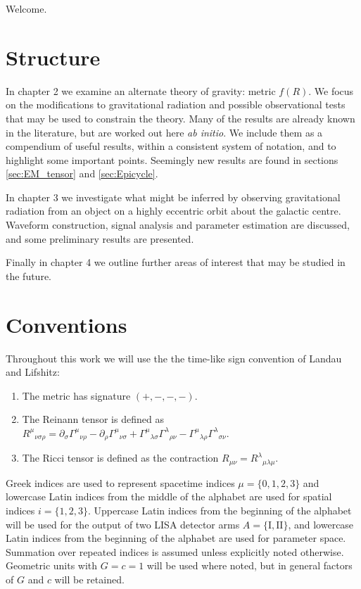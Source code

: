 \documentclass[a4paper, 11pt, titlepage, twoside]{report}
\begin{document}
Welcome.
\newpage

\section{Structure}

In chapter 2 we examine an alternate theory of gravity: metric $f(R)$. We focus on the modifications to gravitational radiation and possible observational tests that may be used to constrain the theory. Many of the results are already known in the literature, but are worked out here {\it ab initio}. We include them as a compendium of useful results, within a consistent system of notation, and to highlight some important points. Seemingly new results are found in sections \ref{sec:EM_tensor} and \ref{sec:Epicycle}.

In chapter 3 we investigate what might be inferred by observing gravitational radiation from an object on a highly eccentric orbit about the galactic centre. Waveform construction, signal analysis and parameter estimation are discussed, and some preliminary results are presented.

Finally in chapter 4 we outline further areas of interest that may be studied in the future.

\section{Conventions}

Throughout this work we will use the the time-like sign convention of Landau and Lifshitz\cite{Landau1975}:
\begin{enumerate}
\item The metric has signature $(+,-,-,-)$.
\item The Reinann tensor is defined as ${R^\mu}_{\nu\sigma\rho} = \partial_\sigma {\Gamma^\mu}_{\nu\rho} - \partial_\rho {\Gamma^\mu}_{\nu\sigma} + {\Gamma^\mu}_{\lambda\sigma}{\Gamma^\lambda}_{\rho\nu} - {\Gamma^\mu}_{\lambda\rho}{\Gamma^\lambda}_{\sigma\nu}$.
\item The Ricci tensor is defined as the contraction $R_{\mu\nu} = {R^\lambda}_{\mu\lambda\mu}$.
\end{enumerate}
Greek indices are used to represent spacetime indices $\mu = \{0,1,2,3\}$ and lowercase Latin indices from the middle of the alphabet are used for spatial indices $i = \{1,2,3\}$. Uppercase Latin indices from the beginning of the alphabet will be used for the output of two LISA detector arms $A = \{\mathrm{I}, \mathrm{II}\}$, and lowercase Latin indices from the beginning of the alphabet are used for parameter space. Summation over repeated indices is assumed unless explicitly noted otherwise. Geometric units with $G = c = 1$ will be used where noted, but in general factors of $G$ and $c$ will be retained.
\end{document}
